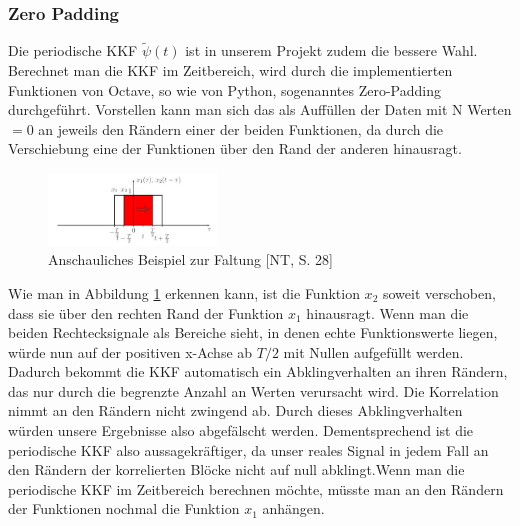 \subsubsection{Zero Padding}
Die periodische KKF $\tilde{\psi}(t)$ ist in unserem Projekt zudem die bessere Wahl. Berechnet man die KKF im Zeitbereich, wird durch die implementierten Funktionen von Octave, so wie von Python, sogenanntes Zero-Padding durchgeführt. Vorstellen kann man sich das als Auffüllen der Daten mit N Werten $=0$ an jeweils den Rändern einer der beiden Funktionen, da durch die Verschiebung eine der Funktionen über den Rand der anderen hinausragt.
\begin{figure}[ht!] 
  \centering
     \includegraphics[width=0.4\textwidth]{img/Faltung}
  \caption{Anschauliches Beispiel zur Faltung [NT, S. 28]}
  \label{fig:Bild1}
\end{figure}
Wie man in Abbildung \ref{fig:Bild1} erkennen kann, ist die Funktion $x_2$ soweit verschoben, dass sie über den rechten Rand der Funktion $x_1$ hinausragt. Wenn man die beiden Rechtecksignale als Bereiche sieht, in denen echte Funktionswerte liegen, würde nun auf der positiven x-Achse ab $T/2$ mit Nullen aufgefüllt werden. Dadurch bekommt die KKF automatisch ein Abklingverhalten an ihren Rändern, das nur durch die begrenzte Anzahl an Werten verursacht wird. Die Korrelation nimmt an den Rändern nicht zwingend ab. Durch dieses Abklingverhalten würden unsere Ergebnisse also abgefälscht werden. Dementsprechend ist die periodische KKF also aussagekräftiger, da unser reales Signal in jedem Fall an den Rändern der korrelierten Blöcke nicht auf null abklingt.Wenn man die periodische KKF im Zeitbereich berechnen möchte, müsste man an den Rändern der Funktionen nochmal die Funktion $x_1$ anhängen.
